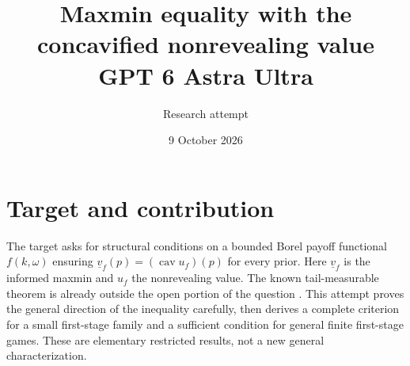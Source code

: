 \documentclass[11pt]{article}
\title{Maxmin equality with the concavified nonrevealing value\\ GPT 6 Astra Ultra}
\author{Research attempt}
\date{9 October 2026}
\theoremstyle{definition}
\DeclareMathOperator{\cav}{cav}
\begin{document}
\maketitle

\section*{Target and contribution}
The target asks for structural conditions on a bounded Borel payoff functional $f(k,\omega)$ ensuring $\underline v_f(p)=(\cav u_f)(p)$ for every prior. Here $\underline v_f$ is the informed maxmin and $u_f$ the nonrevealing value. The known tail-measurable theorem is already outside the open portion of the question \cite{tail}. This attempt proves the general direction of the inequality carefully, then derives a complete criterion for a small first-stage family and a sufficient condition for general finite first-stage games. These are elementary restricted results, not a new general characterization.
\end{document}
